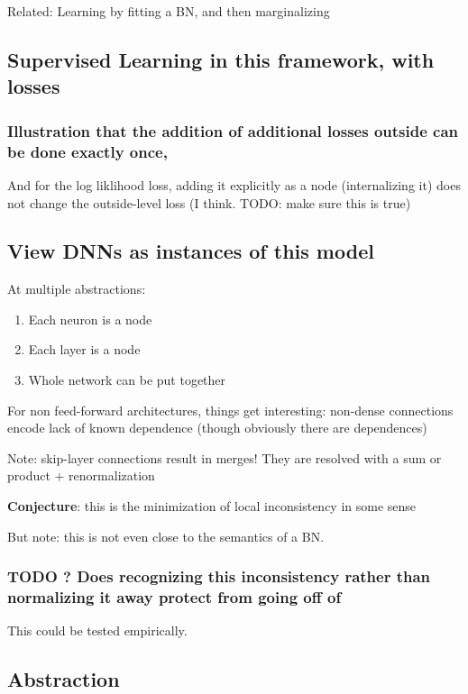 \documentclass[11pt]{article}
\begin{document}
Related: Learning by fitting a BN, and then marginalizing

\subsection{Supervised Learning in this framework, with losses}
\label{sec:orge5e1462}
\subsubsection{Illustration that the addition of additional losses outside can be done exactly once,}
\label{sec:org547f324}
And for the log liklihood loss, adding it explicitly as a node (internalizing it) does not change the outside-level loss (I think. TODO: make sure this is true)

\subsection{View DNNs as instances of this model}
\label{sec:orgb2e6b41}
At multiple abstractions:
\begin{enumerate}
\item Each neuron is a node
\item Each layer is a node
\item Whole network can be put together
\end{enumerate}

For non feed-forward architectures, things get interesting: non-dense connections encode lack of known dependence (though obviously there are dependences) 

Note: skip-layer connections result in merges! They are resolved with a sum or product + renormalization

\textbf{Conjecture}: this is the minimization of local inconsistency in some sense

But note: this is not even close to the semantics of a BN.

\subsubsection{{\bfseries\sffamily TODO} ? Does recognizing this inconsistency rather than normalizing it away protect from going off of}
\label{sec:org21d2f48}
This could be tested empirically.

\subsection{Abstraction}
\label{sec:org3f3e7a6}
\end{document}
